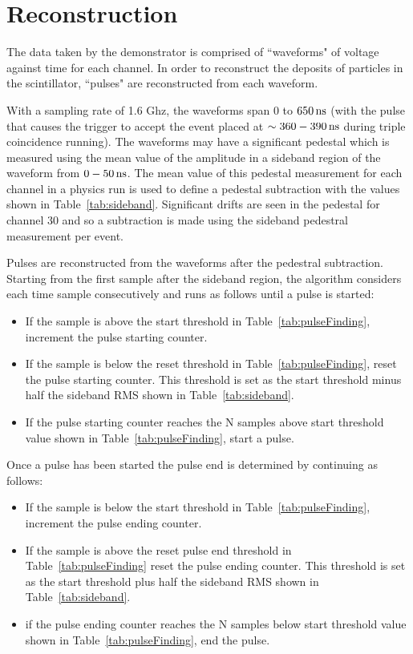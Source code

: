 \documentclass[12pt]{article}
\newcommand{\unit}[1]{\ensuremath{\text{\,#1}}\xspace}
\begin{document}
\section{Reconstruction}

The data taken by the demonstrator is comprised of ``waveforms" of voltage against time for each channel.
In order to reconstruct the deposits of particles in the scintillator, ``pulses" are reconstructed from
each waveform. 

With a sampling rate of 1.6 Ghz, the waveforms span $0$ to $650\unit{ns}$ (with the pulse
that causes the trigger to accept the event placed at $\sim360-390 \unit{ns}$ during 
triple coincidence running).
The waveforms may have a significant pedestal which is measured using the mean
value of the amplitude in a sideband region of the waveform from $0-50 \unit{ns}$.
The mean value of this pedestal measurement for each channel in a physics run 
is used to define a pedestal subtraction with the values
shown in Table~\ref{tab:sideband}. Significant drifts are seen in the pedestal for channel 30
and so a subtraction is made using the sideband pedestral measurement per event.

Pulses are reconstructed from the waveforms after the pedestral subtraction.
Starting from the first sample after the sideband region, the 
algorithm considers each time sample consecutively and runs as 
follows until a pulse is started:

\begin{itemize}
    \item If the sample is above the start threshold in Table~\ref{tab:pulseFinding}, increment the pulse starting counter.
    \item If the sample is below the reset threshold in Table~\ref{tab:pulseFinding}, reset the pulse starting counter. This threshold is set as the start threshold minus half the sideband RMS shown in Table~\ref{tab:sideband}.
    \item If the pulse starting counter reaches the N samples above start threshold value shown in Table~\ref{tab:pulseFinding}, start a pulse.
\end{itemize}

Once a pulse has been started the pulse end is determined by continuing as follows:

\begin{itemize}
    \item If the sample is below the start threshold in Table~\ref{tab:pulseFinding}, increment the pulse ending counter. 
    \item If the sample is above the reset pulse end threshold in Table~\ref{tab:pulseFinding} reset the pulse ending counter. This threshold is set as the start threshold plus half the sideband RMS shown in Table~\ref{tab:sideband}.
    \item if the pulse ending counter reaches the N samples below start threshold value shown in Table~\ref{tab:pulseFinding}, end the pulse.
\end{itemize}
\end{document}

